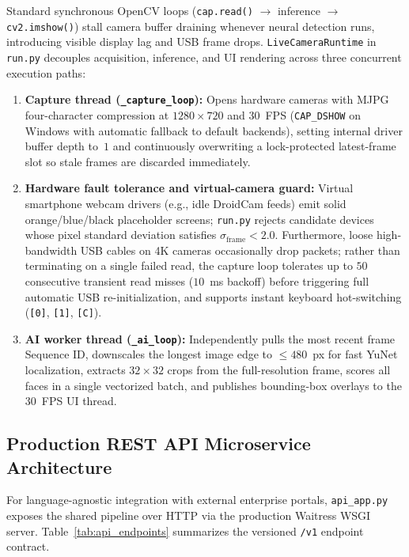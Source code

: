 Standard synchronous OpenCV loops (\texttt{cap.read()} $\to$ inference $\to$ \texttt{cv2.imshow()}) stall camera buffer draining whenever neural detection runs, introducing visible display lag and USB frame drops. \texttt{LiveCameraRuntime} in \texttt{run.py} decouples acquisition, inference, and UI rendering across three concurrent execution paths:
\begin{enumerate}
    \item \textbf{Capture thread (\texttt{\_capture\_loop}):} Opens hardware cameras with MJPG four-character compression at $1280\times720$ and $30$~FPS (\texttt{CAP\_DSHOW} on Windows with automatic fallback to default backends), setting internal driver buffer depth to~$1$ and continuously overwriting a lock-protected latest-frame slot so stale frames are discarded immediately.
    \item \textbf{Hardware fault tolerance and virtual-camera guard:} Virtual smartphone webcam drivers (e.g., idle DroidCam feeds) emit solid orange/blue/black placeholder screens; \texttt{run.py} rejects candidate devices whose pixel standard deviation satisfies $\sigma_{\text{frame}} < 2.0$. Furthermore, loose high-bandwidth USB cables on 4K cameras occasionally drop packets; rather than terminating on a single failed read, the capture loop tolerates up to $50$ consecutive transient read misses ($10$~ms backoff) before triggering full automatic USB re-initialization, and supports instant keyboard hot-switching (\texttt{[0]}, \texttt{[1]}, \texttt{[C]}).
    \item \textbf{AI worker thread (\texttt{\_ai\_loop}):} Independently pulls the most recent frame Sequence ID, downscales the longest image edge to $\le 480$~px for fast YuNet localization, extracts $32\times32$ crops from the full-resolution frame, scores all faces in a single vectorized batch, and publishes bounding-box overlays to the $30$~FPS UI thread.
\end{enumerate}

\subsection{Production REST API Microservice Architecture}

For language-agnostic integration with external enterprise portals, \texttt{api\_app.py} exposes the shared pipeline over HTTP via the production Waitress WSGI server. Table~\ref{tab:api_endpoints} summarizes the versioned \texttt{/v1} endpoint contract.

